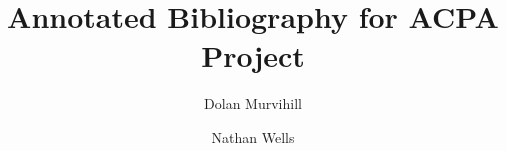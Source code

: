 \documentclass[12pt]{article}
\title{Annotated Bibliography for ACPA Project}
\author{Dolan Murvihill \and Nathan Wells}
\begin{document}
\maketitle
\nocite{*}



\end{document}
